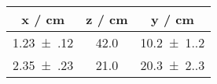 \documentclass{scrartcl}
\begin{document}
\begin{tabular}{ccc}\toprule
x / cm & z / cm & y / cm\\ 
\midrule
\num{1.23(12)} & 42.0 & \num{10.2(1.2)}\\
\num{2.35(23)} & 21.0 & \num{20.3(2.3)}\\
\bottomrule
\end{tabular}
\end{document}
